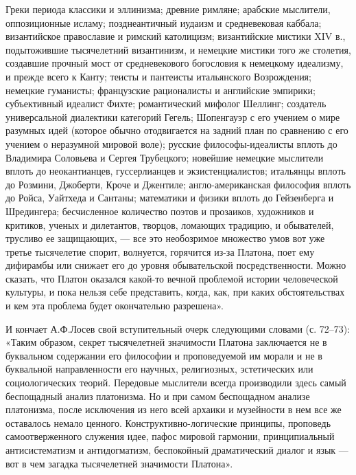 Греки  периода   классики  и  эллинизма;  древние   римляне;  арабские
мыслители,    оппозиционные   исламу;    позднеантичный   иудаизм    и
средневековая каббала; византийское  православие и римский католицизм;
византийские  мистики XIV  в., подытожившие  тысячелетний византинизм,
и  немецкие  мистики  того  же столетия,  создавшие  прочный  мост  от
средневекового  богословия  к  немецкому  идеализму,  и  прежде  всего
к  Канту;  теисты  и   пантеисты  итальянского  Возрождения;  немецкие
гуманисты;   французские    рационалисты   и    английские   эмпирики;
субъективный идеалист Фихте;  романтический мифолог Шеллинг; создатель
универсальной диалектики категорий Гегель;  Шопенгауэр с его учением о
мире  разумных  идей  (которое  обычно  отодвигается  на  задний  план
по  сравнению  с  его  учением о  неразумной  мировой  воле);  русские
философы-идеалисты вплоть до Владимира  Соловьева и Сергея Трубецкого;
новейшие немецкие  мыслители вплоть до неокантианцев,  гуссерлианцев и
экзистенциалистов;  итальянцы вплоть  до  Розмини,  Джоберти, Кроче  и
Джентиле;  англо-американская философия  вплоть до  Ройса, Уайтхеда  и
Сантаны;  математики  и физики  вплоть  до  Гейзенберга и  Шредингера;
бесчисленное  количество поэтов  и прозаиков,  художников и  критиков,
ученых  и  дилетантов,  творцов,   ломающих  традицию,  и  обывателей,
трусливо  ее  защищающих,  ---  все  это  необозримое  множество  умов
вот  уже   третье  тысячелетие  спорит,  волнуется,   горячится  из-за
Платона, поет  ему дифирамбы или  снижает его до  уровня обывательской
посредственности.   Можно  сказать,   что  Платон   оказался  какой-то
вечной  проблемой истории  человеческой культуры,  и пока  нельзя себе
представить, когда, как, при каких  обстоятельствах и кем эта проблема
будет окончательно разрешена».

И  кончает  А.Ф.Лосев  свой  вступительный  очерк  следующими  словами
(с. 72--73):  «Таким образом,  секрет тысячелетней  значимости Платона
заключается не  в буквальном содержании его  философии и проповедуемой
им морали и  не в буквальной направленности  его научных, религиозных,
эстетических  или социологических  теорий. Передовые  мыслители всегда
производили  здесь  самый  беспощадный  анализ платонизма.  Но  и  при
самом беспощадном  анализе платонизма,  после исключения из  него всей
архаики  и  музейности  в  нем   все  же  оставалось  немало  ценного.
Конструктивно-логические принципы, проповедь самоотверженного служения
идее,  пафос   мировой  гармонии,  принципиальный   антисистематизм  и
антидогматизм, беспокойный драматический  диалог и язык ---  вот в чем
загадка тысячелетней значимости Платона».

